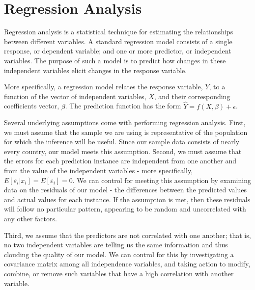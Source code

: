 \documentclass[oneside,12pt]{report}
\begin{document}
\section*{Regression Analysis}

Regression analysis is a statistical technique for estimating the relationships between different variables. A standard regression model consists of a single response, or dependent variable; and one or more predictor, or independent variables. The purpose of such a model is to predict how changes in these independent variables elicit changes in the response variable.

More specifically, a regression model relates the response variable, \begin{math}Y\end{math}, to a function of the vector of independent variables, \begin{math}X\end{math}, and their corresponding coefficients vector, \begin{math}\beta\end{math}. The prediction function has the form \begin{math}\hat{Y} = f(X,\beta) + \epsilon\end{math}.

Several underlying assumptions come with performing regression analysis. First, we must assume that the sample we are using is representative of the population for which the inference will be useful. Since our sample data consists of nearly every country, our model meets this assumption. Second, we must assume that the errors for each prediction instance are independent from one another and from the value of the independent variables - more specifically, \begin{math}E[\varepsilon_i|x_i] = E[\varepsilon_i] = 0\end{math}. We can control for meeting this assumption by examining data on the residuals of our model - the differences between the predicted values and actual values for each instance. If the assumption is met, then these residuals will follow no particular pattern, appearing to be random and uncorrelated with any other factors.

Third, we assume that the predictors are not correlated with one another; that is, no two independent variables are telling us the same information and thus clouding the quality of our model. We can control for this by investigating a covariance matrix among all independence variables, and taking action to modify, combine, or remove such variables that have a high correlation with another variable.
\end{document}
